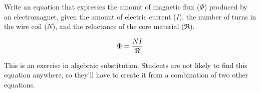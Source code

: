 

Write an equation that expresses the amount of magnetic flux ($\Phi$) produced by an electromagnet, given the amount of electric current ($I$), the number of turns in the wire coil ($N$), and the reluctance of the core material ($\Re$).







$$\Phi = {NI \over \Re}$$







This is an exercise in algebraic substitution.  Students are not likely to find this equation anywhere, so they'll have to create it from a combination of two other equations.



